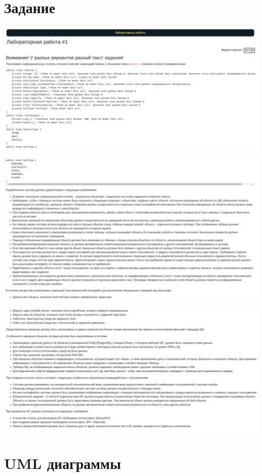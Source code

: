\documentclass{article}
\begin{document}
\section*{Задание}
\begin{center}
    \includegraphics[width=.9\textwidth]{11}
\end{center}
\begin{center}
    \includegraphics[width=.9\textwidth]{2}
\end{center}
\begin{center}
    \includegraphics[width=.9\textwidth]{3}
\end{center}

\section{UML диаграммы}
\end{document}

